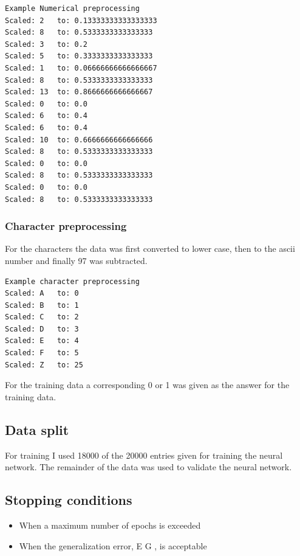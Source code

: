 \documentclass[11pt]{article}
\providecommand{\tightlist}{%
      \setlength{\itemsep}{0pt}\setlength{\parskip}{0pt}}
\begin{document}
\begin{verbatim}
Example Numerical preprocessing
Scaled: 2   to: 0.13333333333333333
Scaled: 8   to: 0.5333333333333333
Scaled: 3   to: 0.2
Scaled: 5   to: 0.3333333333333333
Scaled: 1   to: 0.06666666666666667
Scaled: 8   to: 0.5333333333333333
Scaled: 13  to: 0.8666666666666667
Scaled: 0   to: 0.0
Scaled: 6   to: 0.4
Scaled: 6   to: 0.4
Scaled: 10  to: 0.6666666666666666
Scaled: 8   to: 0.5333333333333333
Scaled: 0   to: 0.0
Scaled: 8   to: 0.5333333333333333
Scaled: 0   to: 0.0
Scaled: 8   to: 0.5333333333333333
\end{verbatim}

\hypertarget{character-preprocessing}{%
\subsubsection{Character preprocessing}\label{character-preprocessing}}

For the characters the data was first converted to lower case, then to
the ascii number and finally 97 was subtracted.

\begin{verbatim}
Example character preprocessing
Scaled: A   to: 0
Scaled: B   to: 1
Scaled: C   to: 2
Scaled: D   to: 3
Scaled: E   to: 4
Scaled: F   to: 5
Scaled: Z   to: 25
\end{verbatim}

For the training data a corresponding 0 or 1 was given as the answer for
the training data.

\hypertarget{data-split}{%
\subsection{Data split}\label{data-split}}

For training I used 18000 of the 20000 entries given for training the
neural network. The remainder of the data was used to validate the
neural network.

\hypertarget{stopping-conditions}{%
\subsection{Stopping conditions}\label{stopping-conditions}}

\begin{itemize}
\tightlist
\item
  When a maximum number of epochs is exceeded
\item
  When the generalization error, E G , is acceptable
\end{itemize}
\end{document}
